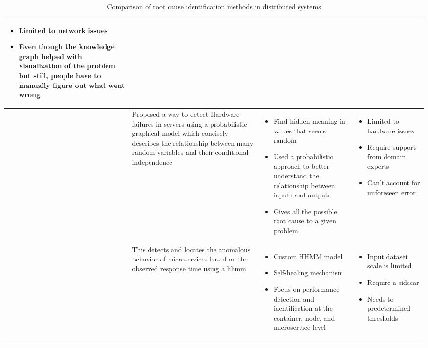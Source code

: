 \begin{longtable}{| p{2cm} | p{4cm} | p{4.5cm} | p{4.5cm} |}
  \begin{itemize}[leftmargin=*,noitemsep,nolistsep] 
    \item Limited to network issues
    \item Even though the knowledge graph helped with visualization of the problem but still, people have to manually figure out what went wrong
  \end{itemize} \\ \hline
  \cite{chigurupati2017root} &
  Proposed a way to detect Hardware failures in servers using a probabilistic graphical model which concisely describes the relationship between many random variables and their conditional independence &
  \vspace{-8mm}
  \begin{itemize}[leftmargin=*,noitemsep,nolistsep] 
    \item Find hidden meaning in values that seems random
    \item Used a probabilistic approach to better understand the relationship between inputs and outputs
    \item Gives all the possible root cause to a given problem
  \end{itemize} &
  \vspace{-8mm}
  \begin{itemize}[leftmargin=*,noitemsep,nolistsep] 
    \item Limited to hardware issues
    \item Require support from domain experts
    \item Can't account for unforeseen error
  \end{itemize} \\ \hline
  \cite{samir2019dla} &
  This detects and locates the anomalous behavior of microservices based on the observed response time using a \ac{hhmm} &
  \vspace{-8mm}
  \begin{itemize}[leftmargin=*,noitemsep,nolistsep] 
    \item Custom HHMM model
    \item Self-healing mechanism
    \item Focus on performance detection and identification at the container, node, and microservice level
  \end{itemize} &
  \vspace{-8mm}
  \begin{itemize}[leftmargin=*,noitemsep,nolistsep] 
    \item Input dataset scale is limited
    \item Require a sidecar
    \item Needs to predetermined thresholds
  \end{itemize} \\ \hline
  \caption{Comparison of root cause identification methods in distributed systems}
\end{longtable}

